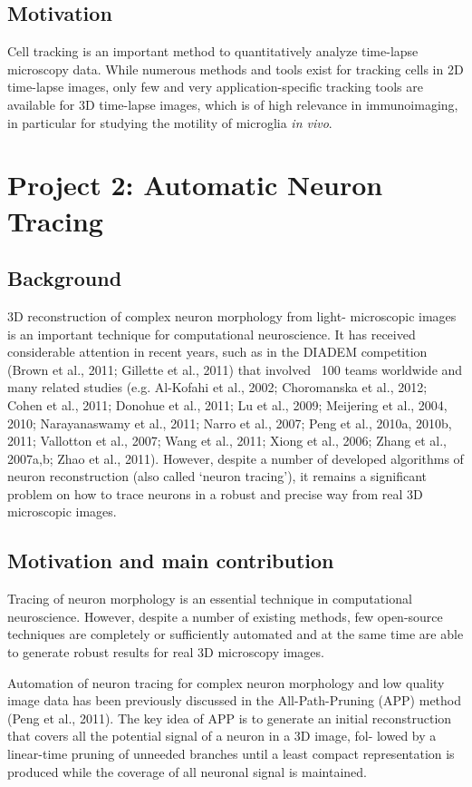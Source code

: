 \subsection{Motivation}
Cell tracking is an important method to quantitatively analyze time-lapse microscopy data. While numerous methods and tools exist for tracking cells in 2D time-lapse images, only few and very application-specific tracking tools are available for 3D time-lapse images, which is of high relevance in immunoimaging, in particular for studying the motility of microglia \emph{in vivo}.
\section{Project 2: Automatic Neuron Tracing}
\subsection{Background}
3D reconstruction of complex neuron morphology from light- microscopic images is an important technique for computational neuroscience. It has received considerable attention in recent years, such as in the DIADEM competition (Brown et al., 2011; Gillette et al., 2011) that involved ~100 teams worldwide and many related studies (e.g. Al-Kofahi et al., 2002; Choromanska et al., 2012; Cohen et al., 2011; Donohue et al., 2011; Lu et al., 2009; Meijering et al., 2004, 2010; Narayanaswamy et al., 2011; Narro et al., 2007; Peng et al., 2010a, 2010b, 2011; Vallotton et al., 2007; Wang et al., 2011; Xiong et al., 2006; Zhang et al., 2007a,b; Zhao et al., 2011). However, despite a number of developed algorithms of neuron reconstruction (also called ‘neuron tracing’), it remains a significant problem on how to trace neurons in a robust and precise way from real 3D microscopic images.

\subsection{Motivation and main contribution}\label{sec:contrib}
Tracing of neuron morphology is an essential technique in computational neuroscience. However, despite a number of existing methods, few open-source techniques are completely or sufficiently automated and at the same time are able to generate robust results for real 3D microscopy images.

Automation of neuron tracing for complex neuron morphology and low quality image data has been previously discussed in the All-Path-Pruning (APP) method (Peng et al., 2011). The key idea of APP is to generate an initial reconstruction that covers all the potential signal of a neuron in a 3D image, fol- lowed by a linear-time pruning of unneeded branches until a least compact representation is produced while the coverage of all neuronal signal is maintained.

